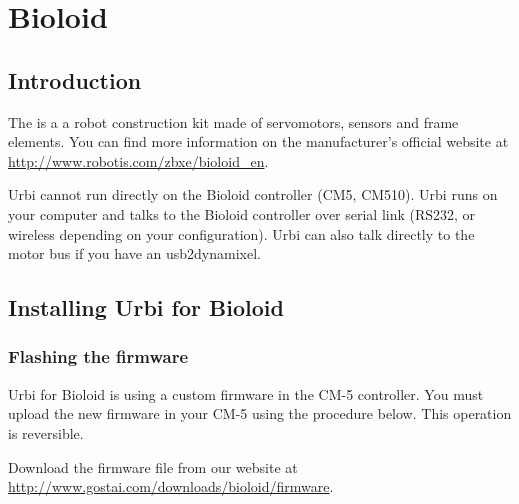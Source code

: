 
\chapter{Bioloid}
\label{sec:bioloid}

\section{Introduction}

The  is a a robot construction kit made of servomotors, sensors
and frame elements. You can find more information on the manufacturer's
official website at \url{http://www.robotis.com/zbxe/bioloid_en}.

Urbi cannot run directly on the Bioloid controller (CM5, CM510). Urbi runs
on your computer and talks to the Bioloid controller over serial link
(RS232, or wireless depending on your configuration). Urbi can also talk
directly to the motor bus if you have an usb2dynamixel.

\section{Installing Urbi for Bioloid}

\subsection{Flashing the firmware}

Urbi for Bioloid is using a custom firmware in the CM-5 controller. You must
upload the new firmware in your CM-5 using the procedure below. This
operation is reversible.

Download the firmware file from our website at
\url{http://www.gostai.com/downloads/bioloid/firmware}.

